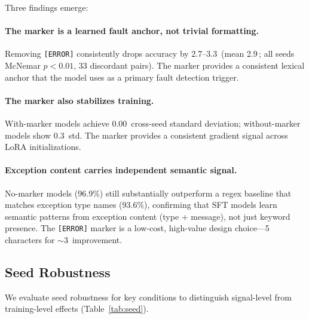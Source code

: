 \documentclass[11pt]{article}
\newcommand{\pp}{\,\text{pp}}
\begin{document}
Three findings emerge:

\paragraph{The marker is a learned fault anchor, not trivial formatting.}
Removing \texttt{[ERROR]} consistently drops accuracy by 2.7--3.3\pp{} (mean 2.9\pp; all seeds McNemar $p < 0.01$, 33 discordant pairs).
The marker provides a consistent lexical anchor that the model uses as a primary fault detection trigger.

\paragraph{The marker also stabilizes training.}
With-marker models achieve 0.00\pp{} cross-seed standard deviation; without-marker models show 0.3\pp{} std.
The marker provides a consistent gradient signal across LoRA initializations.

\paragraph{Exception content carries independent semantic signal.}
No-marker models (96.9\%) still substantially outperform a regex baseline that matches exception type names (93.6\%), confirming that SFT models learn semantic patterns from exception content (type + message), not just keyword presence.
The \texttt{[ERROR]} marker is a low-cost, high-value design choice---5 characters for ${\sim}$3\pp{} improvement.


\subsection{Seed Robustness}
\label{sec:seed}

We evaluate seed robustness for key conditions to distinguish signal-level from training-level effects (Table~\ref{tab:seed}).
\end{document}
